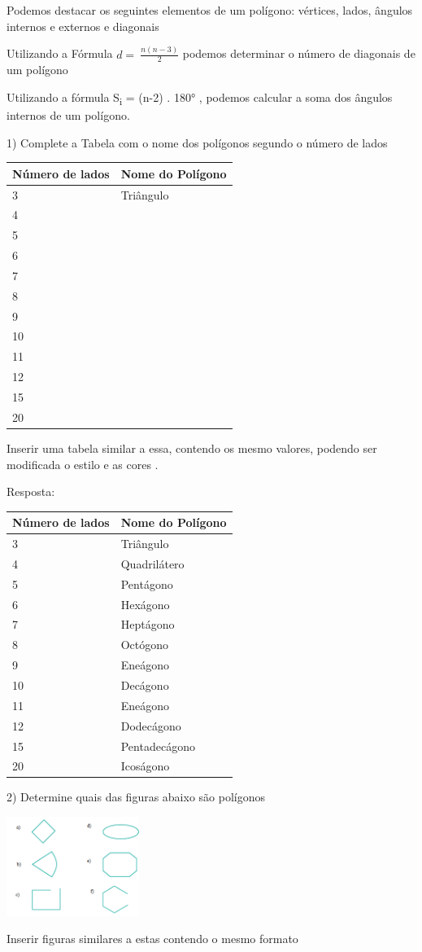 {Podemos destacar os seguintes elementos de um polígono: vértices, lados,
ângulos internos e externos e diagonais

Utilizando a Fórmula \(d = \ \frac{n(n - 3)}{2}\) podemos determinar o
número de diagonais de um polígono

Utilizando a fórmula S\textsubscript{i} = (n-2) . 180° , podemos
calcular a soma dos ângulos internos de um polígono.


1) Complete a Tabela com o nome dos polígonos segundo o número de lados

\begin{longtable}[]{@{}ll@{}}
\toprule
Número de lados & Nome do Polígono\tabularnewline
\midrule
\endhead
3 & Triângulo\tabularnewline
4 & ~\tabularnewline
5 & ~\tabularnewline
6 & ~\tabularnewline
7 & ~\tabularnewline
8 & ~\tabularnewline
9 & ~\tabularnewline
10 & ~\tabularnewline
11 & ~\tabularnewline
12 & ~\tabularnewline
15 & ~\tabularnewline
20 & ~\tabularnewline
\bottomrule
\end{longtable}

Inserir uma tabela similar a essa, contendo os mesmo valores, podendo
ser modificada o estilo e as cores .

Resposta:

\begin{longtable}[]{@{}ll@{}}
\toprule
Número de lados & Nome do Polígono\tabularnewline
\midrule
\endhead
3 & Triângulo\tabularnewline
4 & Quadrilátero\tabularnewline
5 & Pentágono\tabularnewline
6 & Hexágono\tabularnewline
7 & Heptágono\tabularnewline
8 & Octógono\tabularnewline
9 & Eneágono\tabularnewline
10 & Decágono\tabularnewline
11 & Eneágono\tabularnewline
12 & Dodecágono\tabularnewline
15 & Pentadecágono\tabularnewline
20 & Icoságono\tabularnewline
\bottomrule
\end{longtable}

2) Determine quais das figuras abaixo são polígonos

\includegraphics[width=1.7in,height=1.26763in]{./imgSAEB_8_MAT/media/image7.png}

Inserir figuras similares a estas contendo o mesmo formato

}
